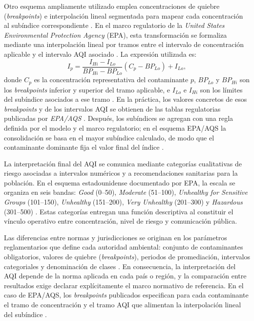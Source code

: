 Otro esquema ampliamente utilizado emplea concentraciones de quiebre (\textit{breakpoints}) e interpolación lineal segmentada para mapear cada concentración al subíndice correspondiente \cite{ART01,ART02}. En el marco regulatorio de la \textit{United States Environmental Protection Agency} (EPA), esta transformación se formaliza mediante una interpolación lineal por tramos entre el intervalo de concentración aplicable y el intervalo AQI asociado \cite{DATA_EPA_AQI_TAD}. La expresión utilizada es:
\begin{equation}
I_p=\frac{I_{Hi}-I_{Lo}}{BP_{Hi}-BP_{Lo}}\left(C_p-BP_{Lo}\right)+I_{Lo},
\label{eq:aqi_interp_epa}
\end{equation}
donde \(C_p\) es la concentración representativa del contaminante \(p\), \(BP_{Lo}\) y \(BP_{Hi}\) son los \textit{breakpoints} inferior y superior del tramo aplicable, e \(I_{Lo}\) e \(I_{Hi}\) son los límites del subíndice asociados a ese tramo \cite{DATA_EPA_AQI_TAD}. En la práctica, los valores concretos de esos \textit{breakpoints} y de los intervalos AQI se obtienen de las tablas regulatorias publicadas por \textit{EPA/AQS} \cite{DATA_EPA_AQS_BREAKPOINTS}. Después, los subíndices se agregan con una regla definida por el modelo y el marco regulatorio; en el esquema EPA/AQS la consolidación se basa en el mayor subíndice calculado, de modo que el contaminante dominante fija el valor final del índice \cite{DATA_EPA_AQI_TAD,DATA_EPA_AQS_BREAKPOINTS}.

La interpretación final del AQI se comunica mediante categorías cualitativas de riesgo asociadas a intervalos numéricos y a recomendaciones sanitarias para la población. En el esquema estadounidense documentado por EPA, la escala se organiza en seis bandas: \textit{Good} (0--50), \textit{Moderate} (51--100), \textit{Unhealthy for Sensitive Groups} (101--150), \textit{Unhealthy} (151--200), \textit{Very Unhealthy} (201--300) y \textit{Hazardous} (301--500) \cite{DATA_EPA_AQI_TAD}. Estas categorías entregan una función descriptiva al constituir el vínculo operativo entre concentración, nivel de riesgo y comunicación pública.

Las diferencias entre normas y jurisdicciones se originan en los parámetros reglamentarios que define cada autoridad ambiental: conjunto de contaminantes obligatorios, valores de quiebre (\textit{breakpoints}), periodos de promediación, intervalos categoriales y denominación de clases \cite{ART01,ART02}. En consecuencia, la interpretación del AQI depende de la norma aplicada en cada país o región, y la comparación entre resultados exige declarar explícitamente el marco normativo de referencia. En el caso de EPA/AQS, los \textit{breakpoints} publicados especifican para cada contaminante el tramo de concentración y el tramo AQI que alimentan la interpolación lineal del subíndice \cite{DATA_EPA_AQS_BREAKPOINTS}.

